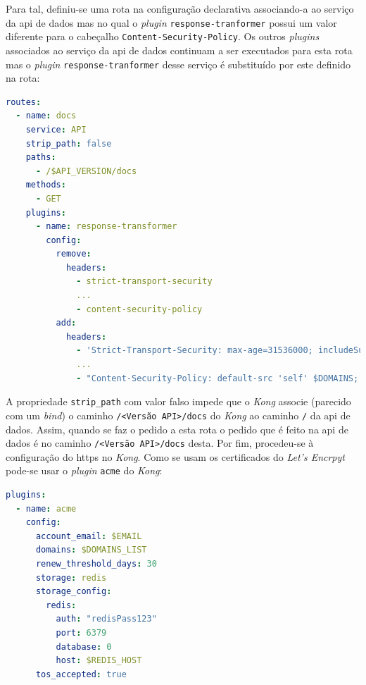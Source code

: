 Para tal, definiu-se uma rota na configuração declarativa associando-a ao serviço da \acrshort{api} de dados mas no qual o \textit{plugin} \texttt{response-tranformer} possui um valor diferente para o cabeçalho \texttt{Content-Security-Policy}. Os outros \textit{plugins} associados ao serviço da \acrshort{api} de dados continuam a ser executados para esta rota mas o \textit{plugin} \texttt{response-tranformer} desse serviço é substituído por este definido na rota:

\begin{lstlisting}[language=yaml, caption=Configuração declarativa do \textit{Kong}: Rota da documentação]
routes:
  - name: docs
    service: API
    strip_path: false
    paths:
      - /$API_VERSION/docs
    methods:
      - GET
    plugins:
      - name: response-transformer
        config:
          remove:
            headers:
              - strict-transport-security
              ...
              - content-security-policy
          add:
            headers:
              - 'Strict-Transport-Security: max-age=31536000; includeSubDomains; preload'
              ...
              - "Content-Security-Policy: default-src 'self' $DOMAINS; img-src 'self' https://validator.swagger.io data: $DOMAINS; style-src 'self' 'unsafe-inline' $DOMAINS; script-src 'self' 'unsafe-inline' $DOMAINS"
\end{lstlisting}

A propriedade \texttt{strip\_path} com valor falso impede que o \textit{Kong} associe (parecido com um \textit{bind}) o caminho \texttt{/<Versão API>/docs} do \textit{Kong} ao caminho \texttt{/} da \acrshort{api} de dados. Assim, quando se faz o pedido a esta rota o pedido que é feito na \acrshort{api} de dados é no caminho \texttt{/<Versão API>/docs} desta. 
Por fim, procedeu-se à configuração do \acrshort{https} no \textit{Kong}. Como se usam os certificados do \textit{Let's Encrpyt} pode-se usar o \textit{plugin} \texttt{acme} do \textit{Kong}\cite{kongACME}:

\begin{lstlisting}[language=yaml, caption=Configuração declarativa do \textit{Kong}: \textit{plugin} \texttt{acme}]
plugins:
  - name: acme
    config:
      account_email: $EMAIL
      domains: $DOMAINS_LIST
      renew_threshold_days: 30
      storage: redis
      storage_config:
        redis:
          auth: "redisPass123"
          port: 6379
          database: 0
          host: $REDIS_HOST
      tos_accepted: true
\end{lstlisting}


